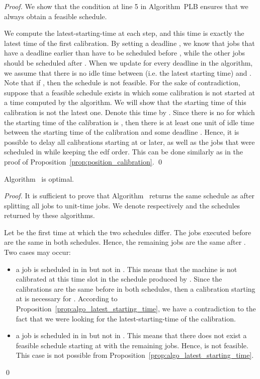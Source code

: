 \begin{proof}
We show that the condition at line 5 in Algorithm~PLB ensures 
that we always obtain a feasible schedule.

We compute the latest-starting-time at each step, and this time is exactly the latest time of the first calibration. By setting a deadline , we know that jobs that have a deadline earlier than  have to be scheduled before , while the other jobs should be scheduled after . When we update  for every deadline  in the algorithm, we assume that there is no idle time between  (i.e. the latest starting time) and . Note that if , then the schedule is not feasible. For the sake of contradiction, suppose that a feasible schedule exists in which some calibration is not started at a time computed by the algorithm. We will show that the starting time of this calibration is not the latest one. Denote this time by .
Since there is no  for which the starting time of the calibration is  , then there is at least one unit of idle time between the starting time of the calibration and some deadline . Hence, it is possible to delay all calibrations starting at  or later, as well as the jobs that were scheduled in  while keeping the {\sc edf} order. This can be done similarly as in the proof of Proposition~\ref{prop:position_calibration}.
\qed\end{proof}


\begin{prop}
Algorithm~ is optimal.
\end{prop}


\begin{proof}
It is sufficient to prove that Algorithm~ returns the same schedule as  after splitting all jobs to unit-time jobs. We denote respectively  and  the schedules returned by these algorithms.

Let  be the first time at which the two schedules differ. The jobs executed before  are the same in both schedules. Hence, the remaining jobs are the same after . Two cases may occur:
\begin{itemize}
\item a job is scheduled in  in  but not in .
This means that the machine is not calibrated at this time slot in the schedule produced by .
Since the calibrations are the same before  in both schedules, then a calibration starting at  is necessary for . According to Proposition~\ref{prop:algo_latest_starting_time}, we have a contradiction to the fact that we were looking for the latest-starting-time of the calibration.
\item a job is scheduled in  in  but not in . This means that there does not exist a feasible schedule starting at  with the remaining jobs. Hence,  is not feasible. This case is not possible from Proposition~\ref{prop:algo_latest_starting_time}.
\end{itemize}
\qed\end{proof}


